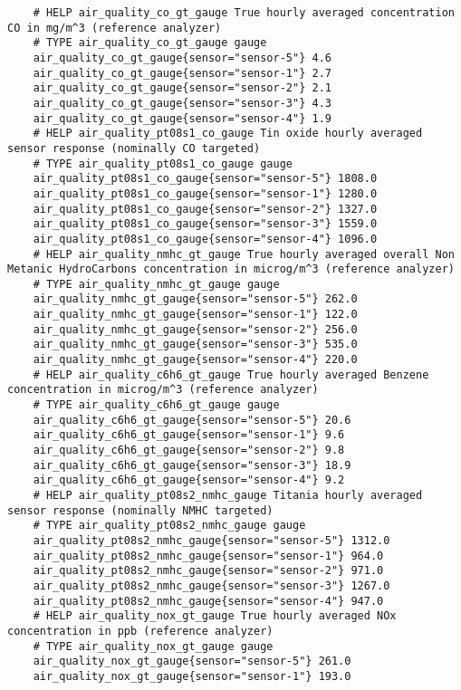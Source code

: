 \begin{verbatim}
    # HELP air_quality_co_gt_gauge True hourly averaged concentration CO in mg/m^3 (reference analyzer)
    # TYPE air_quality_co_gt_gauge gauge
    air_quality_co_gt_gauge{sensor="sensor-5"} 4.6
    air_quality_co_gt_gauge{sensor="sensor-1"} 2.7
    air_quality_co_gt_gauge{sensor="sensor-2"} 2.1
    air_quality_co_gt_gauge{sensor="sensor-3"} 4.3
    air_quality_co_gt_gauge{sensor="sensor-4"} 1.9
    # HELP air_quality_pt08s1_co_gauge Tin oxide hourly averaged sensor response (nominally CO targeted)
    # TYPE air_quality_pt08s1_co_gauge gauge
    air_quality_pt08s1_co_gauge{sensor="sensor-5"} 1808.0
    air_quality_pt08s1_co_gauge{sensor="sensor-1"} 1280.0
    air_quality_pt08s1_co_gauge{sensor="sensor-2"} 1327.0
    air_quality_pt08s1_co_gauge{sensor="sensor-3"} 1559.0
    air_quality_pt08s1_co_gauge{sensor="sensor-4"} 1096.0
    # HELP air_quality_nmhc_gt_gauge True hourly averaged overall Non Metanic HydroCarbons concentration in microg/m^3 (reference analyzer)
    # TYPE air_quality_nmhc_gt_gauge gauge
    air_quality_nmhc_gt_gauge{sensor="sensor-5"} 262.0
    air_quality_nmhc_gt_gauge{sensor="sensor-1"} 122.0
    air_quality_nmhc_gt_gauge{sensor="sensor-2"} 256.0
    air_quality_nmhc_gt_gauge{sensor="sensor-3"} 535.0
    air_quality_nmhc_gt_gauge{sensor="sensor-4"} 220.0
    # HELP air_quality_c6h6_gt_gauge True hourly averaged Benzene concentration in microg/m^3 (reference analyzer)
    # TYPE air_quality_c6h6_gt_gauge gauge
    air_quality_c6h6_gt_gauge{sensor="sensor-5"} 20.6
    air_quality_c6h6_gt_gauge{sensor="sensor-1"} 9.6
    air_quality_c6h6_gt_gauge{sensor="sensor-2"} 9.8
    air_quality_c6h6_gt_gauge{sensor="sensor-3"} 18.9
    air_quality_c6h6_gt_gauge{sensor="sensor-4"} 9.2
    # HELP air_quality_pt08s2_nmhc_gauge Titania hourly averaged sensor response (nominally NMHC targeted)
    # TYPE air_quality_pt08s2_nmhc_gauge gauge
    air_quality_pt08s2_nmhc_gauge{sensor="sensor-5"} 1312.0
    air_quality_pt08s2_nmhc_gauge{sensor="sensor-1"} 964.0
    air_quality_pt08s2_nmhc_gauge{sensor="sensor-2"} 971.0
    air_quality_pt08s2_nmhc_gauge{sensor="sensor-3"} 1267.0
    air_quality_pt08s2_nmhc_gauge{sensor="sensor-4"} 947.0
    # HELP air_quality_nox_gt_gauge True hourly averaged NOx concentration in ppb (reference analyzer)
    # TYPE air_quality_nox_gt_gauge gauge
    air_quality_nox_gt_gauge{sensor="sensor-5"} 261.0
    air_quality_nox_gt_gauge{sensor="sensor-1"} 193.0

\end{verbatim}
